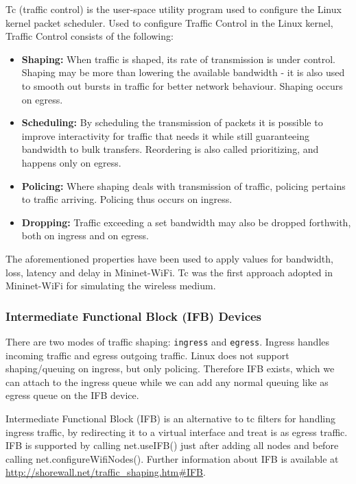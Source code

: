 Tc (traffic control) is the user-space utility program used to configure the Linux kernel packet scheduler. Used to configure Traffic Control in the Linux kernel, Traffic Control consists of the following:

\begin{itemize}
  \item \textbf{Shaping:} When traffic is shaped, its rate of transmission is under control. Shaping may be more than lowering the available bandwidth - it is also used to smooth out bursts in traffic for better network behaviour. Shaping occurs on egress.
  \item \textbf{Scheduling:} By  scheduling  the  transmission  of  packets it is possible to improve interactivity for traffic  that  needs  it  while  still guaranteeing  bandwidth  to  bulk  transfers. Reordering is also called prioritizing, and happens only on egress.
  \item \textbf{Policing:} Where shaping deals with transmission of traffic, policing  pertains to traffic arriving. Policing thus occurs on ingress.
  \item \textbf{Dropping:} Traffic exceeding a set bandwidth may also be dropped forthwith, both on ingress and on egress.
\end{itemize}

The aforementioned properties have been used to apply values for bandwidth, loss, latency and delay in Mininet-WiFi. Tc was the first approach adopted in Mininet-WiFi for simulating the wireless medium.

\subsubsection{Intermediate Functional Block (IFB) Devices}\label{ifb}

There are two modes of traffic shaping: \texttt{ingress} and \texttt{egress}. Ingress handles incoming traffic and egress outgoing traffic. Linux does not support shaping/queuing on ingress, but only policing. Therefore IFB exists, which we can attach to the ingress queue while we can add any normal queuing like as egress queue on the IFB device.

Intermediate Functional Block (IFB) is an alternative to tc filters for handling ingress traffic, by redirecting it to a virtual interface and treat is as egress traffic. IFB is supported by calling net.useIFB() just after adding all nodes and before calling net.configureWifiNodes(). Further information about IFB is available at \url{http://shorewall.net/traffic\_shaping.htm\#IFB}.

